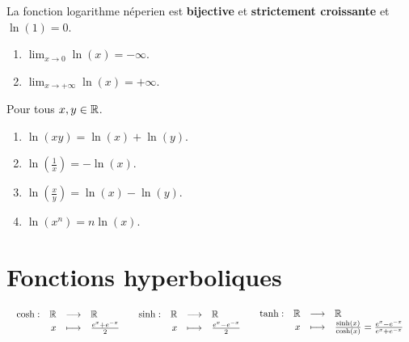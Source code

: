 \begin{proposition}
	La fonction logarithme néperien est \textbf{bijective} et \textbf{strictement croissante} et $\ln(1) = 0$.
    \begin{enumerate}
            \item $\lim_{x \to 0} \ln(x) = -\infty$.
            \item $\lim_{x \to +\infty} \ln(x) = +\infty$.
        \end{enumerate}
    \noindent Pour tous $x, y \in \mathbb{R}$.
    \begin{enumerate}
            \item $\ln(xy) = \ln(x) + \ln(y)$.
            \item $\ln(\frac{1}{x}) = -\ln(x)$.
            \item $\ln(\frac{x}{y}) = \ln(x) - \ln(y)$.
            \item $\ln(x^n) = n \ln(x)$.
        \end{enumerate}
\end{proposition}

\section{Fonctions hyperboliques}

\begin{definition}
	\begin{center}
		$
		\begin{array}{ccc}
			\begin{array}{rrcl} \cosh : & \mathbb{R} & \longrightarrow & \mathbb{R} \\ & x & \longmapsto & \frac{e^x + e^{-x}}{2} \end{array}
			&
			\begin{array}{rrcl} \sinh : & \mathbb{R} & \longrightarrow & \mathbb{R} \\ & x & \longmapsto & \frac{e^x - e^{-x}}{2} \end{array}
			&
			\begin{array}{rrcl} \tanh : & \mathbb{R} & \longrightarrow & \mathbb{R} \\ & x & \longmapsto & \frac{\sinh(x)}{\cosh(x)} = \frac{e^x - e^{-x}}{e^x + e^{-x}} \end{array}
		\end{array}
		$
	\end{center}
\end{definition}

